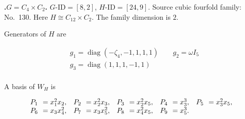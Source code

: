 \documentclass[12pt]{amsart}
\makeatletter
\numberwithin{equation}{section}
\theoremstyle{plain}
\theoremstyle{definition}
\theoremstyle{remark}
\DeclareMathOperator{\diag}{diag}
\newcommand{\PBasisLabel}[1]{\mathrlap{P_{#1}}\phantom{P_{99}}}
\newenvironment{SecEightAlignedBasis}[1]{%
  \begingroup\renewcommand{\arraystretch}{1.18}%
  \[\begin{array}{@{}#1@{}}%
}{\end{array}\]\endgroup}
\newenvironment{familydisplay}{%
  \begingroup
  \setlength{\arraycolsep}{1.35pt}%
  \renewcommand{\arraystretch}{0.96}%
  \setlength{\jot}{2pt}%
}{\endgroup}
\makeatother
\begin{document}
\par{}\medskip\noindent\textbf{.\enspace $G=C_4\times C_2$.}\label{fam:threefold-no-33}
$G\text{-ID}=[8,2]$, $H\text{-ID}=[24,9]$.
Source cubic fourfold family: No.~130.  Here
$H\cong C_{12}\times C_2$.
The family dimension is $2$.
\par\smallskip\noindent Generators of $H$ are\par\nopagebreak
\begin{familydisplay}
\begin{align*}
&g_{1}=\diag(-\zeta_4,-1,1,1,1)
\qquad g_{2}=\omega I_5\\
&g_{3}=\diag(1,1,1,-1,1)\\
\end{align*}
\end{familydisplay}
\par\smallskip\noindent A basis of $W_H$ is\par\nopagebreak
\begin{familydisplay}
\begin{SecEightAlignedBasis}{l@{\quad}l@{\quad}l@{\quad}l@{\quad}l}
\PBasisLabel{1}=x_{1}^{2}x_{2}, & \PBasisLabel{2}=x_{2}^{2}x_{3}, & \PBasisLabel{3}=x_{2}^{2}x_{5}, & \PBasisLabel{4}=x_{3}^{3}, & \PBasisLabel{5}=x_{3}^{2}x_{5},\\
\PBasisLabel{6}=x_{3}x_{4}^{2}, & \PBasisLabel{7}=x_{3}x_{5}^{2}, & \PBasisLabel{8}=x_{4}^{2}x_{5}, & \multicolumn{2}{@{}l@{}}{\PBasisLabel{9}=x_{5}^{3}.}
\end{SecEightAlignedBasis}
\end{familydisplay}
\end{document}
